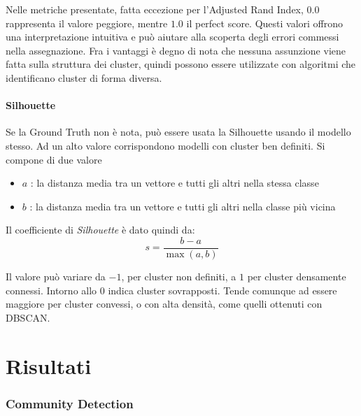 Nelle metriche presentate, fatta eccezione per l'Adjusted Rand Index, $0.0$ rappresenta il valore peggiore, mentre $1.0$ il perfect score. Questi valori offrono una interpretazione intuitiva e può aiutare alla scoperta degli errori commessi nella assegnazione. Fra i vantaggi è degno di nota che nessuna assunzione viene fatta sulla struttura dei cluster, quindi possono essere utilizzate con algoritmi che identificano cluster di forma diversa.

\paragraph{Silhouette}
Se la Ground Truth non è nota, può essere usata la Silhouette usando il modello stesso. Ad un alto valore corrispondono modelli con cluster ben definiti. Si compone di due valore
\begin{itemize}
\item $a$ : la distanza media tra un vettore e tutti gli altri nella stessa classe
\item $b$ : la distanza media tra un vettore e tutti gli altri nella classe più vicina
\end{itemize}

Il coefficiente di \textit{Silhouette} è dato quindi da:
\begin{equation}
s = \frac{b - a}{\max (a,b)}
\end{equation}

Il valore può variare da $-1$, per cluster non definiti, a $1$ per cluster densamente connessi. Intorno allo $0$ indica cluster sovrapposti. Tende comunque ad essere maggiore per cluster convessi, o con alta densità, come quelli ottenuti con DBSCAN.

\section{Risultati}

\subsubsection{Community Detection}

